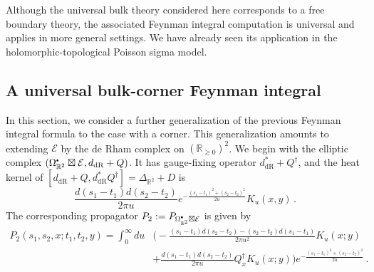 \documentclass[11pt]{article}
\newcommand{\R}{\mathbb{R}}
\newcommand{\derham}{\mathrm{dR}}
\newcommand\sbullet[1][.5]{\mathbin{\vcenter{\hbox{\scalebox{#1}{$\bullet$}}}}}
\numberwithin{equation}{section}
\begin{document}
Although the universal bulk theory considered here corresponds to a free boundary theory, the associated Feynman integral computation is universal and applies in more general settings. We have already seen its application  in the holomorphic-topological Poisson sigma model. 


\subsection{A universal bulk-corner Feynman integral}
\label{sec:uni_cor_int}
In this section, we consider a further generalization of the previous Feynman integral formula to the case with a corner. This generalization amounts to extending $\mathcal{E}$ by the de Rham complex on $(\R_{\geq 0})^2$. We begin with the elliptic complex $(\Omega^{\sbullet}_{\R^2}\boxtimes \mathcal{E} ,d_{\mathrm{dR}}+Q)$. It has gauge-fixing operator $d_{\mathrm{dR}}^* + Q^{\dagger} $, and the heat kernel of $[d_\derham + Q,d_{\derham}^*Q^{\dagger}] =  \Delta_{\R^2} +D$ is
\begin{equation*}
	\frac{d(s_1-t_1)d(s_2 - t_2)}{2\pi u}e^{-\frac{(s_1-t_1)^2 + (s_2 - t_2)^2}{2 u}}K_u(x,y)\,.
\end{equation*}
The corresponding propagator $P_2 := P_{\Omega^{\sbullet}_{\R^2}\boxtimes \mathcal{E}}$ is given by
\begin{equation}\label{eq:Prop_R2}
\begin{aligned}
		P_2(s_1,s_2,x;t_1,t_2,y) = \int_0^{\infty} du&\Big(-\frac{(s_1-t_1)d(s_2 - t_2) - (s_2 - t_2)d(s_1 - t_1)}{2\pi u^2}K_u(x;y)\\ 
		& + \frac{d(s_1-t_1)d(s_2 - t_2)}{2\pi u}Q_x^{\dagger}K_u(x;y) \Big) e^{-\frac{(s_1-t_1)^2 + (s_2 - t_2)^2}{2 u}} \,.
\end{aligned}
\end{equation}
\end{document}
